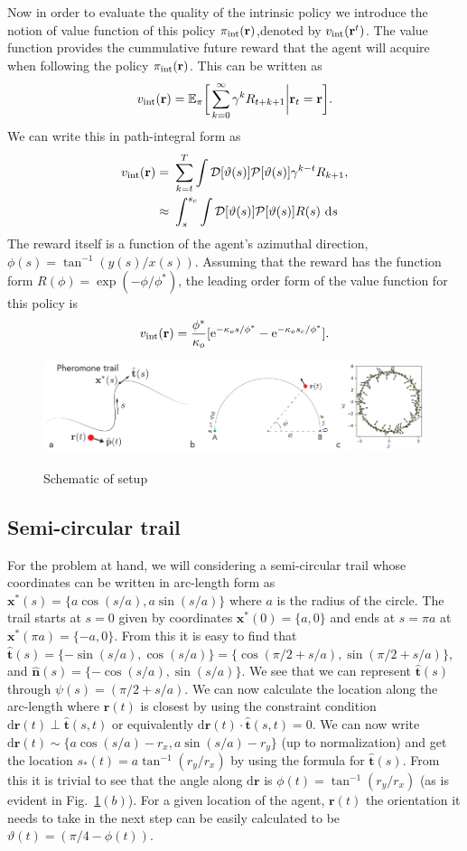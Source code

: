 \documentclass[%
reprint,
superscriptaddress,
floatfix,
amsmath,
amssymb,
aps,
notitlepage
]{revtex4-1}
\def\d{\text{d}}
\def\e{\text{e}}
\def\r{\mathbf{r}}
\def\xst{\mathbf{x}^*}
\def\E{\mathbb{E}}
\def\th{\hat{\mathbf{t}}}
\def\nh{\hat{\mathbf{n}}}
\def\P{\mathcal{P}}
\def\D{\mathcal{D}}
\def\theta{\vartheta}
\begin{document}
Now in order to evaluate the quality of the intrinsic policy we introduce the notion of value function
of this policy $\pi_{\rm int}(\r)$,denoted by $v_{\rm int}(\r^t)$. The value function provides the cummulative
future reward that the agent will acquire when following the policy $\pi_{\rm int}(\r)$. This can be written as
\[
    v_{\rm int}(\r) = \E_\pi \bigg[ \sum_{k=0}^\infty \gamma^k R_{t+k+1} \bigg| \r_t = \r \bigg].
\]
We can write this in path-integral form as
\begin{align}
    v_{\rm int}(\r) =& \ \sum_{k=t}^T \int \D[\theta(s)] \P[\theta(s)] \gamma^{k-t} R_{k+1}, \\
    \approx& \ \int_{s}^{s_c} \int \D[\theta(s)] \P[\theta(s)] R(s) \ \d s
\end{align}
The reward itself is a function of the agent's azimuthal direction, $\phi(s) = \tan^{-1}(y(s)/x(s))$.
Assuming that the reward has the function form $R(\phi) = \exp(-\phi/\phi^*)$, the leading order form of 
the value function for this policy is
\[
    v_{\rm int}(\r) = \frac{\phi^*}{\kappa_o} [ \e^{-\kappa_os/\phi^*} - \e^{-\kappa_o s_c/\phi^*}].
\]

\begin{figure}
    \centering
    \includegraphics[width=\textwidth]{./figs/schematic.pdf}\label{fig:schm1}
    \caption{Schematic of setup}
\end{figure}

\subsection{Semi-circular trail}
For the problem at hand, we will considering a semi-circular trail whose coordinates can be
written in arc-length form as $\xst(s) = \{ a \cos(s/a), a \sin(s/a) \}$ where $a$ is the radius
of the circle. The trail starts at $s=0$ given by coordinates $\xst(0) = \{ a, 0 \}$ and ends at
$s=\pi a$ at $\xst (\pi a) = \{ -a, 0 \}$. From this it is easy to find that $\th(s) = \{ -\sin(s/a) , \cos(s/a) \}
= \{ \cos(\pi/2 + s/a), \sin(\pi/2 + s/a) \}$, and $\nh(s) = \{ -\cos(s/a) , \sin(s/a) \}$. We see that we
can represent $\th(s)$ through $\psi(s) = (\pi/2 + s/a)$. We can now calculate the location along the arc-length
where $\r(t)$ is closest by using the constraint condition $\d\r(t) \perp \th(s,t)$ or equivalently $\d\r(t)
\cdot \th(s,t) = 0$. We can now write $\d \r(t) \sim \{ a \cos(s/a) - r_x, a \sin(s/a) - r_y \}$
(up to normalization) and get the location $s_*(t) = a \tan^{-1}(r_y/r_x)$ by using the formula
for $\th(s)$. From this it is trivial to see that the angle along $\d \r$ is $\phi(t) = \tan^{-1}(r_y/r_x)$
(as is evident in Fig.~\ref{fig:schm1}$(b)$). For a given location of the agent, $\r(t)$ the orientation
it needs to take in the next step can be easily calculated to be $\theta(t) = (\pi/4 - \phi(t))$.
\end{document}
